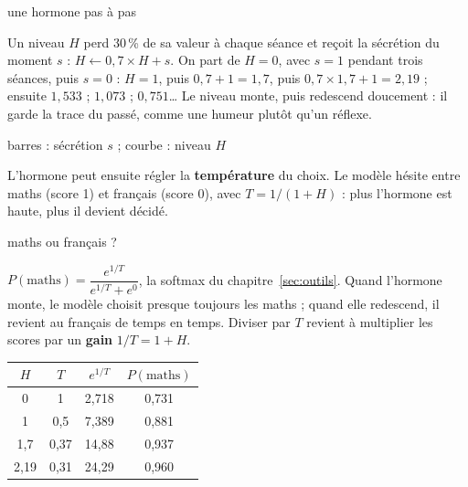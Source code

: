 \documentclass[fontsize=10pt,paper=a4,parskip=half-]{scrartcl}
\newcommand{\q}[1]{\og #1\fg{}}
\newcommand{\pc}{\,\%}
\begin{document}
\begin{calcul}{une hormone pas à pas}
\begin{minipage}{0.55\linewidth}
\raggedright
Un niveau $H$ perd 30\pc{} de sa valeur à chaque séance et reçoit la sécrétion du moment
$s$ : $H \leftarrow 0,7\times H + s$. On part de $H=0$, avec $s=1$ pendant trois séances,
puis $s=0$ :
$H = 1$, puis $0,7 + 1 = 1,7$, puis $0,7\times 1,7 + 1 = 2,19$ ; ensuite $1,533$ ;
$1,073$ ; $0,751$\dots{} Le niveau monte, puis redescend doucement : il garde la trace du
passé, comme une humeur plutôt qu'un réflexe.
\end{minipage}\hfill
\begin{minipage}{0.4\linewidth}
\centering
{}

{\sffamily\scriptsize\color{gris}barres : sécrétion $s$ ; courbe : niveau $H$}
\end{minipage}
\end{calcul}

L'hormone peut ensuite régler la \textbf{température} du choix. Le modèle hésite entre
\q{maths} (score 1) et \q{français} (score 0), avec $T = 1/(1+H)$ : plus l'hormone est
haute, plus il devient \q{décidé}.

\begin{calcul}{maths ou français ?}
\begin{minipage}{0.5\linewidth}
\raggedright
$P(\text{maths}) = \dfrac{e^{1/T}}{e^{1/T} + e^{0}}$, la softmax du chapitre~\ref{sec:outils}.
Quand l'hormone monte, le modèle choisit presque toujours les maths ; quand elle
redescend, il revient au français de temps en temps. Diviser par $T$ revient à multiplier
les scores par un \textbf{gain} $1/T = 1+H$.
\end{minipage}\hfill
\begin{minipage}{0.46\linewidth}
\centering\small
\begin{tabular}{cccc}
\toprule
$H$ & $T$ & $e^{1/T}$ & $P(\text{maths})$\\
\midrule
0 & 1 & 2,718 & 0,731\\
1 & 0,5 & 7,389 & 0,881\\
1,7 & 0,37 & 14,88 & 0,937\\
2,19 & 0,31 & 24,29 & 0,960\\
\bottomrule
\end{tabular}
\end{minipage}
\end{calcul}
\end{document}
